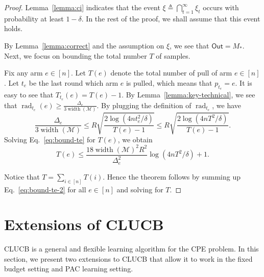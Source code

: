 \documentclass{article}
\newcommand{\Algorithm}{{\small \textsf{CLUCB}}\xspace}
\newcommand{\Problem}{{CPE}\xspace}
\newcommand{\M}{\mathcal M}
\DeclareMathOperator{\rank}{width}
\DeclareMathOperator{\rad}{rad}
\newcommand{\out}{\mathsf{Out}}
\begin{document}
\begin{proof}
Lemma~\ref{lemma:ci} indicates that the event $\xi \triangleq \bigcap_{t=1}^\infty \xi_t$ occurs with probability at least $1-\delta$.
In the rest of the proof, we shall assume that this event holds.

By Lemma~\ref{lemma:correct} and the assumption on $\xi$, we see that $\out=M_*$.
Next, we focus on bounding the total number $T$ of samples.

Fix any arm $e\in [n]$.
Let $T(e)$ denote the total number of pull of arm $e\in [n]$.
Let $t_e$ be the last round which arm $e$ is pulled, which means that $p_{t_e} = e$. 
It is easy to see that 
$T_{t_e}(e) = T(e) - 1$.
By Lemma~\ref{lemma:key-technical}, we see that 
$\rad_{t_e}(e) \ge \frac{\Delta_e}{3\rank(\M)}$.
By plugging the definition of $\rad_{t_e}$, we have
\begin{equation}
\frac{\Delta_e}{3\rank(\M)} \le 
R\sqrt{\frac{2\log\left(4n t_e^2/\delta\right)}{T(e)-1}} \le
R\sqrt{\frac{2\log\left(4n T^2/\delta\right)}{T(e)-1}}.
\label{eq:bound-te}
\end{equation}
Solving Eq.~\eqref{eq:bound-te} for $T(e)$, we obtain
\begin{equation}
\label{eq:bound-te-2}
T(e) \le \frac{18 \rank(\M)^2 R^2}{\Delta_e^2} \log(4nT^2/\delta)+1.
\end{equation}

Notice that $T=\sum_{i\in[n]} T(i)$. 
Hence the theorem follows by summing up Eq.~\eqref{eq:bound-te-2} for all $e\in [n]$ and solving for $T$.
\end{proof}


\section{Extensions of \Algorithm}
\label{section:extensions}

\Algorithm is a general and flexible learning algorithm for the \Problem problem.
In this section, we present two extensions to \Algorithm that allow it to work in the fixed budget setting and PAC learning setting.
\end{document}
